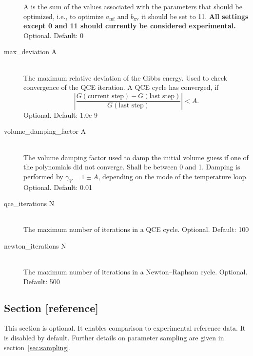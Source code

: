 \documentclass{scrartcl}
\begin{document}
\begin{description}
        A is the sum of the values associated with the parameters that should be optimized, i.e., to optimize $a_\mathrm{mf}$ and $b_\mathrm{xv}$ it should be set to 11.
        \textbf{All settings except 0 and 11 should currently be considered experimental.}
        Optional. Default: 0
    \item[max\_deviation A] \hfill \\
        The maximum relative deviation of the Gibbs energy.
        Used to check convergence of the QCE iteration.
        A QCE cycle has converged, if \[\left|\frac{G(\text{current step}) - G(\text{last step})}{G(\text{last step})}\right| < A.\]
        Optional. Default: 1.0e-9
        \vspace{0.1cm}
    \item[volume\_damping\_factor A] \hfill \\
        The volume damping factor used to damp the initial volume guess if one of the polynomials did not converge.
        Shall be between 0 and 1.
        Damping is performed by $\gamma_V = 1 \pm A$, depending on the mode of the temperature loop.
        Optional. Default: 0.01
        \vspace{0.1cm}
    \item[qce\_iterations N] \hfill \\
        The maximum number of iterations in a QCE cycle.
        Optional. Default: 100
        \vspace{0.1cm}
    \item[newton\_iterations N] \hfill \\
        The maximum number of iterations in a Newton--Raphson cycle.
        Optional. Default: 500
\end{description}

\subsection{Section [reference]}

This section is optional.
It enables comparison to experimental reference data.
It is disabled by default.
Further details on parameter sampling are given in section~\vref{sec:sampling}.
\end{document}
